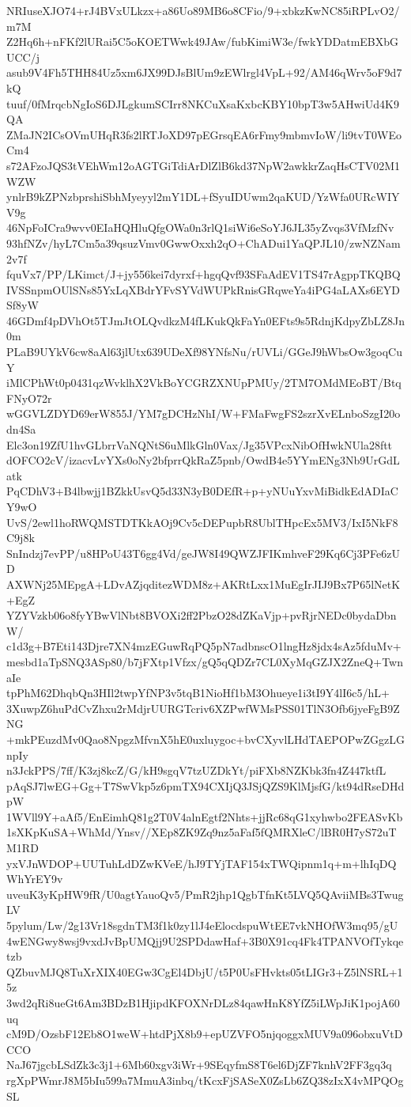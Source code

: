 NRIuseXJO74+rJ4BVxULkzx+a86Uo89MB6o8CFio/9+xbkzKwNC85iRPLvO2/m7M
Z2Hq6h+nFKf2lURai5C5oKOETWwk49JAw/fubKimiW3e/fwkYDDatmEBXbGUCC/j
asub9V4Fh5THH84Uz5xm6JX99DJsBlUm9zEWlrgl4VpL+92/AM46qWrv5oF9d7kQ
tuuf/0fMrqcbNgIoS6DJLgkumSCIrr8NKCuXsaKxbcKBY10bpT3w5AHwiUd4K9QA
ZMaJN2ICsOVmUHqR3fs2lRTJoXD97pEGrsqEA6rFmy9mbmvIoW/li9tvT0WEoCm4
s72AFzoJQS3tVEhWm12oAGTGiTdiArDlZlB6kd37NpW2awkkrZaqHsCTV02M1WZW
ynlrB9kZPNzbprshiSbhMyeyyl2mY1DL+fSyuIDUwm2qaKUD/YzWfa0URcWIYV9g
46NpFoICra9wvv0EIaHQHluQfgOWa0n3rlQ1siWi6eSoYJ6JL35yZvqs3VfMzfNv
93hfNZv/hyL7Cm5a39qsuzVmv0GwwOxxh2qO+ChADui1YaQPJL10/zwNZNam2v7f
fquVx7/PP/LKimct/J+jy556kei7dyrxf+hgqQvf93SFaAdEV1TS47rAgppTKQBQ
IVSSnpmOUlSNs85YxLqXBdrYFvSYVdWUPkRnisGRqweYa4iPG4aLAXs6EYDSf8yW
46GDmf4pDVhOt5TJmJtOLQvdkzM4fLKukQkFaYn0EFts9s5RdnjKdpyZbLZ8Jn0m
PLaB9UYkV6cw8aAl63jlUtx639UDeXf98YNfsNu/rUVLi/GGeJ9hWbsOw3goqCuY
iMlCPhWt0p0431qzWvklhX2VkBoYCGRZXNUpPMUy/2TM7OMdMEoBT/BtqFNyO72r
wGGVLZDYD69erW855J/YM7gDCHzNhI/W+FMaFwgFS2szrXvELnboSzgI20odn4Sa
Elc3on19ZfU1hvGLbrrVaNQNtS6uMlkGln0Vax/Jg35VPcxNibOfHwkNUla28ftt
dOFCO2cV/izacvLvYXs0oNy2bfprrQkRaZ5pnb/OwdB4e5YYmENg3Nb9UrGdLatk
PqCDhV3+B4lbwjj1BZkkUsvQ5d33N3yB0DEfR+p+yNUuYxvMiBidkEdADIaCY9wO
UvS/2ewl1hoRWQMSTDTKkAOj9Cv5cDEPupbR8UblTHpcEx5MV3/IxI5NkF8C9j8k
SnIndzj7evPP/u8HPoU43T6gg4Vd/geJW8I49QWZJFIKmhveF29Kq6Cj3PFe6zUD
AXWNj25MEpgA+LDvAZjqditezWDM8z+AKRtLxx1MuEgIrJIJ9Bx7P65lNetK+EgZ
YZYVzkb06o8fyYBwVlNbt8BVOXi2ff2PbzO28dZKaVjp+pvRjrNEDc0bydaDbnW/
c1d3g+B7Eti143Djre7XN4mzEGuwRqPQ5pN7adbnscO1lngHz8jdx4sAz5fduMv+
mesbd1aTpSNQ3ASp80/b7jFXtp1Vfzx/gQ5qQDZr7CL0XyMqGZJX2ZneQ+TwnaIe
tpPhM62DhqbQn3HIl2twpYfNP3v5tqB1NioHf1bM3Ohueye1i3tI9Y4lI6c5/hL+
3XuwpZ6huPdCvZhxu2rMdjrUURGTcriv6XZPwfWMsPSS01TlN3Ofb6jyeFgB9ZNG
+mkPEuzdMv0Qao8NpgzMfvnX5hE0uxluygoc+bvCXyvlLHdTAEPOPwZGgzLGnpIy
n3JckPPS/7ff/K3zj8kcZ/G/kH9sgqV7tzUZDkYt/piFXb8NZKbk3fn4Z447ktfL
pAqSJ7lwEG+Gg+T7SwVkp5z6pmTX94CXIjQ3JSjQZS9KlMjsfG/kt94dRseDHdpW
1WVll9Y+aAf5/EnEimhQ81g2T0V4alnEgtf2Nhts+jjRc68qG1xyhwbo2FEASvKb
1sXKpKuSA+WhMd/Ynsv//XEp8ZK9Zq9nz5aFaf5fQMRXleC/lBR0H7yS72uTM1RD
yxVJnWDOP+UUTuhLdDZwKVeE/hJ9TYjTAF154xTWQipnm1q+m+lhIqDQWhYrEY9v
uveuK3yKpHW9fR/U0agtYauoQv5/PmR2jhp1QgbTfnKt5LVQ5QAviiMBs3TwugLV
5pylum/Lw/2g13Vr18sgdnTM3f1k0zy1lJ4eElocdspuWtEE7vkNHOfW3mq95/gU
4wENGwy8wsj9vxdJvBpUMQjj9U2SPDdawHaf+3B0X91cq4Fk4TPANVOfTykqetzb
QZbuvMJQ8TuXrXIX40EGw3CgEl4DbjU/t5P0UsFHvkts05tLIGr3+Z5lNSRL+15z
3wd2qRi8ueGt6Am3BDzB1HjipdKFOXNrDLz84qawHnK8YfZ5iLWpJiK1pojA60uq
cM9D/OzsbF12Eb8O1weW+htdPjX8b9+epUZVFO5njqoggxMUV9a096obxuVtDCCO
NaJ67jgcbLSdZk3c3j1+6Mb60xgv3iWr+9SEqyfmS8T6el6DjZF7knhV2FF3gq3q
rgXpPWmrJ8M5bIu599a7MmuA3inbq/tKcxFjSASeX0ZsLb6ZQ38zIxX4vMPQOgSL
